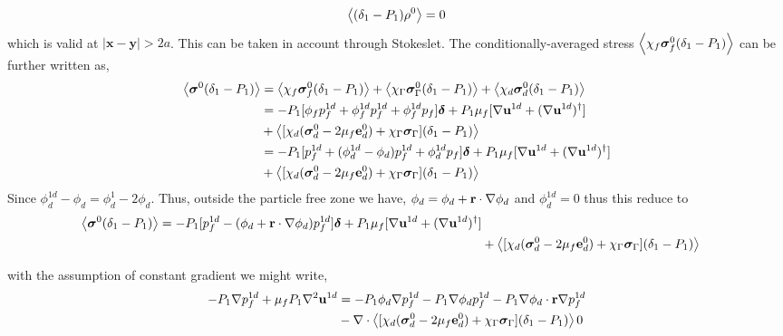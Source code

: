 {\begin{align}
    \left<(\delta_1 - P_1)\rho^0\right>
    =
    0
\end{align}
which is valid at $|\textbf{x} - \textbf{y}| >2a$. 
This can be taken in account through Stokeslet. 
The  conditionally-averaged stress $\left<\chi_f \bm\sigma^0_f (\delta_1 - P_1)\right>$ can be further written as, 
\begin{align*}
    \left<\bm\sigma^0 (\delta_1 - P_1)\right>
    &= \left<\chi_f \bm\sigma^0_f (\delta_1 - P_1)\right>
    + \left<\chi_\Gamma \bm\sigma^0_\Gamma (\delta_1 - P_1)\right>
    + \left<\chi_d \bm\sigma^0_d (\delta_1 - P_1)\right>\\
    &= 
    - P_1 [
        \phi_f p_f^{1d} 
        +\phi_f^{1d} p_f^{1d}
        +\phi_f^{1d} p_f 
    ]\bm\delta
    + P_1 \mu_f [\mathbf{\nabla} \textbf{u}^{1d}+(\mathbf{\nabla} \textbf{u}^{1d})^\dagger] \\
    &+ \left<[\chi_d (\bm\sigma_d^0 - 2 \mu_f \textbf{e}^0_d ) + \chi_\Gamma \bm\sigma_\Gamma ]  (\delta_1 - P_1)\right>\\
    &= 
    - P_1 [
         p_f^{1d} 
        +(\phi_d^{1d} - \phi_d ) p_f^{1d}
        +\phi_d^{1d} p_f 
    ]\bm\delta
    + P_1 \mu_f [\mathbf{\nabla} \textbf{u}^{1d}+(\mathbf{\nabla} \textbf{u}^{1d})^\dagger] \\
    &+ \left<[\chi_d (\bm\sigma_d^0 - 2 \mu_f \textbf{e}^0_d ) + \chi_\Gamma \bm\sigma_\Gamma ]  (\delta_1 - P_1)\right>
\end{align*}
Since $\phi_d^{1d} -\phi_d  = \phi_d^1 - 2 \phi_d$. 
Thus, outside the particle free zone we have,  $\phi_d = \phi_d + \textbf{r}\cdot \mathbf{\nabla} \phi_d$ and $\phi_d^{1d} = 0$ thus this reduce to 
\begin{align}
    \left<\bm\sigma^0 (\delta_1 - P_1)\right>
    = 
    - P_1 [
         p_f^{1d} 
        - (\phi_d + \textbf{r}\cdot \mathbf{\nabla} \phi_d) p_f^{1d}
    ]\bm\delta
    + P_1 \mu_f [\mathbf{\nabla} \textbf{u}^{1d}+(\mathbf{\nabla} \textbf{u}^{1d})^\dagger] \\
    &+ \left<[\chi_d (\bm\sigma_d^0 - 2 \mu_f \textbf{e}^0_d ) + \chi_\Gamma \bm\sigma_\Gamma ]  (\delta_1 - P_1)\right>
\end{align}

with the assumption of constant gradient we might write, 
\begin{align*}
    - P_1 \mathbf{\nabla} p_f^{1d} 
    + \mu_f P_1 \mathbf{\nabla}^2  \textbf{u}^{1d}
    &= 
    - P_1 \phi_d \mathbf{\nabla} p_f^{1d}
    - P_1 \mathbf{\nabla}\phi_d  p_f^{1d}
    - P_1 \mathbf{\nabla}\phi_d \cdot \textbf{r} \mathbf{\nabla} p_f^{1d} \\
    &-\mathbf{\nabla}\cdot \left<[\chi_d (\bm\sigma_d^0 - 2 \mu_f \textbf{e}^0_d ) + \chi_\Gamma \bm\sigma_\Gamma ]  (\delta_1 - P_1)\right>
    0 
\end{align*}



}
